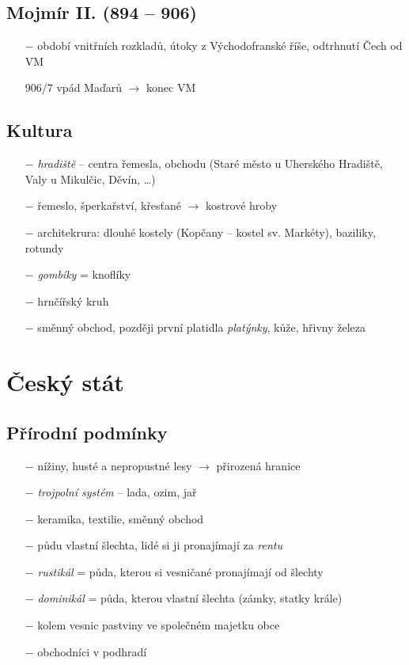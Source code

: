 \documentclass{article}
\begin{document}
\subsection*{Mojmír II. (894 -- 906)}
\begin{itemize}
    \vspace{-0.5em}
    \setlength\itemsep{0.15em}
    \item[$-$] období vnitřních rozkladů, útoky z Východofranské říše, odtrhnutí Čech od VM
    \item[906/7] vpád Maďarů $\rightarrow$ konec VM
\end{itemize}

\subsection*{Kultura}
\begin{itemize}
    \vspace{-0.5em}
    \setlength\itemsep{0.15em}
    \item[$-$] \textit{hradiště} -- centra řemesla, obchodu (Staré město u Uherského Hradiště, Valy u Mikulčic, Děvín, \dots)
    \item[$-$] řemeslo, šperkařství, křesťané $\rightarrow$ kostrové hroby
    \item[$-$] architekrura: dlouhé kostely (Kopčany -- kostel sv. Markéty), baziliky, rotundy
    \item[$-$] \textit{gombíky} = knoflíky
    \item[$-$] hrnčířský kruh
    \item[$-$] směnný obchod, později první platidla \textit{platýnky}, kůže, hřivny železa
\end{itemize}


\section*{Český stát}

\subsection*{Přírodní podmínky}
\begin{itemize}
    \vspace{-0.5em}
    \setlength\itemsep{0.15em}
    \item[$-$] nížiny, husté a nepropustné lesy $\rightarrow$ přirozená hranice
    \item[$-$] \textit{trojpolní systém} -- lada, ozim, jař
    \item[$-$] keramika, textilie, směnný obchod
    \item[$-$] půdu vlastní šlechta, lidé si ji pronajímají za \textit{rentu}
    \item[$-$] \textit{rustikál} = půda, kterou si vesničané pronajímají od šlechty
    \item[$-$] \textit{dominikál} = půda, kterou vlastní šlechta (zámky, statky krále)
    \item[$-$] kolem vesnic pastviny ve společném majetku obce
    \item[$-$] obchodníci v podhradí
\end{itemize}
\end{document}
